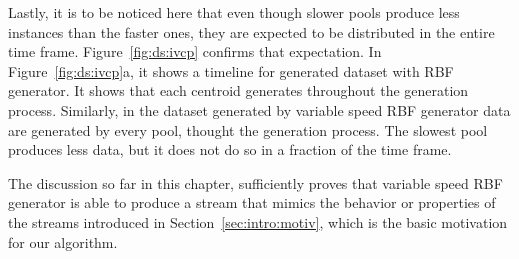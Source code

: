 Lastly, it is to be noticed here that even though slower pools produce less instances than the faster ones, they are expected to be distributed in the entire time frame. Figure~\ref{fig:ds:ivcp} confirms that expectation. In Figure~\ref{fig:ds:ivcp}a, it shows a timeline for generated dataset with RBF generator. It shows that each centroid generates throughout the generation process. Similarly, in the dataset generated by variable speed RBF generator data are generated by every pool, thought the generation process. The slowest pool produces less data, but it does not do so in a fraction of the time frame.

The discussion so far in this chapter, sufficiently proves that variable speed RBF generator is able to produce a stream that mimics the behavior or properties of the streams introduced in Section~\ref{sec:intro:motiv}, which is the basic motivation for our algorithm.
